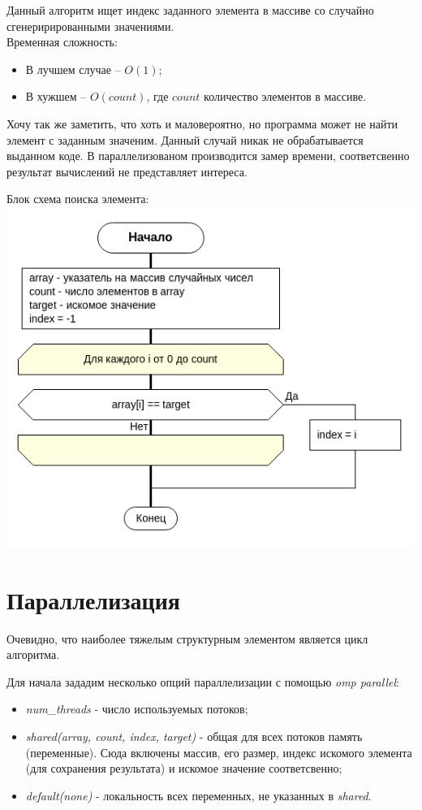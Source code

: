 \documentclass[a4paper, 12pt]{article}
\begin{document}
Данный алгоритм ищет индекс заданного элемента в массиве со случайно сгенерирированными значениями.\\
Временная сложность:
\begin{itemize}
 \item В лучшем случае -- $O(1)$;
 \item В хужшем -- $O(count)$, где $count$ количество элементов в массиве.
\end{itemize}

Хочу так же заметить, что хоть и маловероятно, но программа может не найти элемент с заданным значеним. Данный случай никак не обрабатывается выданном коде. В параллелизованом производится замер времени, соответсвенно результат вычислений не представляет интереса.

\vspace{0.5cm}

Блок схема поиска элемента:\\
\includegraphics[scale=0.6]{res/original.png}



\section{Параллелизация}

Очевидно, что наиболее тяжелым структурным элементом является цикл алгоритма.

Для начала зададим несколько опций параллелизации с помощью \textit{omp parallel}:
\begin{itemize}
 \item \textit{num\_threads} - число используемых потоков;
 \item \textit{shared(array, count, index, target)} - общая для всех потоков память (переменные). Сюда включены массив, его размер, индекс искомого элемента (для сохранения результата) и искомое значение соответсвенно;
 \item \textit{default(none)} - локальность всех переменных, не указанных в \textit{shared}.
\end{itemize}
\end{document}
